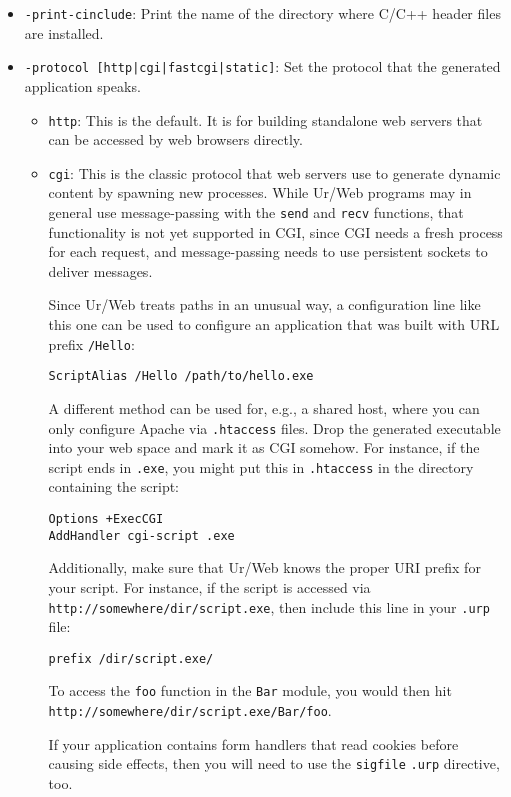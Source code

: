 \documentclass{article}
\begin{document}
\begin{itemize}
\item \texttt{-print-cinclude}: Print the name of the directory where C/C++ header files are installed.

\item \texttt{-protocol [http|cgi|fastcgi|static]}: Set the protocol that the generated application speaks.
  \begin{itemize}
  \item \texttt{http}: This is the default.  It is for building standalone web servers that can be accessed by web browsers directly.

  \item \texttt{cgi}: This is the classic protocol that web servers use to generate dynamic content by spawning new processes.  While Ur/Web programs may in general use message-passing with the \texttt{send} and \texttt{recv} functions, that functionality is not yet supported in CGI, since CGI needs a fresh process for each request, and message-passing needs to use persistent sockets to deliver messages.

    Since Ur/Web treats paths in an unusual way, a configuration line like this one can be used to configure an application that was built with URL prefix \texttt{/Hello}:
    \begin{verbatim}
ScriptAlias /Hello /path/to/hello.exe
    \end{verbatim}

    A different method can be used for, e.g., a shared host, where you can only configure Apache via \texttt{.htaccess} files.  Drop the generated executable into your web space and mark it as CGI somehow.  For instance, if the script ends in \texttt{.exe}, you might put this in \texttt{.htaccess} in the directory containing the script:
    \begin{verbatim}
Options +ExecCGI
AddHandler cgi-script .exe
    \end{verbatim}

    Additionally, make sure that Ur/Web knows the proper URI prefix for your script.  For instance, if the script is accessed via \texttt{http://somewhere/dir/script.exe}, then include this line in your \texttt{.urp} file:
    \begin{verbatim}
prefix /dir/script.exe/
    \end{verbatim}

    To access the \texttt{foo} function in the \texttt{Bar} module, you would then hit \texttt{http://somewhere/dir/script.exe/Bar/foo}.

    If your application contains form handlers that read cookies before causing side effects, then you will need to use the \texttt{sigfile} \texttt{.urp} directive, too.


\end{itemize}
\end{itemize}
\end{document}
